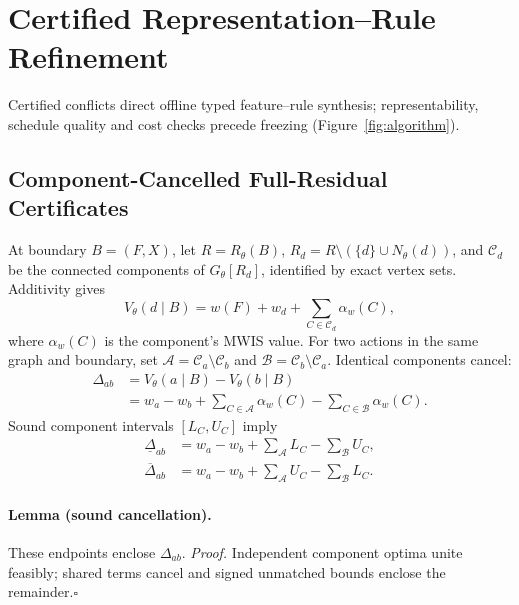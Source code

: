 \section{Certified Representation--Rule Refinement}
\label{sec:method}

Certified conflicts direct offline typed feature--rule synthesis;
representability, schedule quality and cost checks precede freezing
(Figure~\ref{fig:algorithm}).

\subsection{Component-Cancelled Full-Residual Certificates}
\label{sec:method:certificates}
At boundary $B=(F,X)$, let $R=R_\theta(B)$,
$R_d=R\setminus(\{d\}\cup N_\theta(d))$, and $\mathcal C_d$ be the
connected components of $G_\theta[R_d]$, identified by exact vertex sets.
Additivity gives
\begin{equation}
 V_\theta(d\mid B)=w(F)+w_d+\sum_{C\in\mathcal C_d}\alpha_w(C),
 \label{eq:component-completion}
\end{equation}
where $\alpha_w(C)$ is the component's MWIS value. For two actions in the
same graph and boundary, set $\mathcal A=\mathcal C_a\setminus\mathcal C_b$
and $\mathcal B=\mathcal C_b\setminus\mathcal C_a$. Identical components cancel:
\begin{equation}
 \begin{split}
 \Delta_{ab}&=V_\theta(a\mid B)-V_\theta(b\mid B)\\
 &=w_a-w_b+\sum_{C\in\mathcal A}\alpha_w(C)
             -\sum_{C\in\mathcal B}\alpha_w(C).
 \end{split}
 \label{eq:cancelled-difference}
\end{equation}
Sound component intervals $[L_C,U_C]$ imply
\begin{equation}
 \begin{split}
 \underline\Delta_{ab}&=w_a-w_b+\sum_{\mathcal A}L_C-\sum_{\mathcal B}U_C,\\
 \overline\Delta_{ab}&=w_a-w_b+\sum_{\mathcal A}U_C-\sum_{\mathcal B}L_C.
 \end{split}
 \label{eq:difference-envelope}
\end{equation}
\paragraph{Lemma (sound cancellation).}
These endpoints enclose $\Delta_{ab}$.
\emph{Proof.} Independent component optima unite feasibly; shared terms
cancel and signed unmatched bounds enclose the remainder.\hfill$\square$

